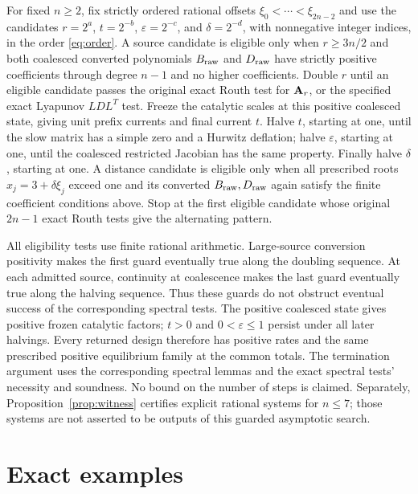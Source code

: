 \begin{remark}\label{rem:design}
For fixed \(n\ge2\), fix strictly ordered rational offsets
\(\xi_0<\cdots<\xi_{2n-2}\) and use the candidates
\(r=2^a\), \(t=2^{-b}\), \(\varepsilon=2^{-c}\), and
\(\delta=2^{-d}\), with nonnegative integer indices, in the order
\eqref{eq:order}. A source candidate is eligible only when
\(r\ge3n/2\) and both coalesced converted polynomials \(B_{\mathrm{raw}}\)
and \(D_{\mathrm{raw}}\) have strictly positive coefficients through degree
\(n-1\) and no higher coefficients. Double \(r\) until an eligible
candidate passes the original exact Routh test for \(\mathbf A_r\), or the
specified exact Lyapunov \(LDL^T\) test. Freeze the catalytic scales at
this positive coalesced state, giving unit prefix currents and final
current \(t\). Halve \(t\), starting at one, until the slow matrix has
a simple zero and a Hurwitz deflation; halve \(\varepsilon\), starting
at one, until the coalesced restricted Jacobian has the same property.
Finally halve \(\delta\), starting at one. A distance candidate is
eligible only when all prescribed roots \(x_j=3+\delta\xi_j\) exceed one
and its converted \(B_{\mathrm{raw}},D_{\mathrm{raw}}\) again satisfy the finite
coefficient conditions above. Stop at the first eligible candidate
whose original \(2n-1\) exact Routh tests give the alternating pattern.

All eligibility tests use finite rational arithmetic. Large-source
conversion positivity makes the first guard eventually true along the
doubling sequence. At each admitted source, continuity at coalescence
makes the last guard eventually true along the halving sequence. Thus
these guards do not obstruct eventual success of the corresponding
spectral tests. The positive coalesced state gives positive frozen
catalytic factors; \(t>0\) and \(0<\varepsilon\le1\) persist under all
later halvings. Every returned design therefore has positive rates and
the same prescribed positive equilibrium family at the common totals.
The termination argument uses the corresponding spectral lemmas and
the exact spectral tests' necessity and soundness. No bound on the
number of steps is claimed. Separately, Proposition~\ref{prop:witness}
certifies explicit rational systems for \(n\le7\); those systems are not
asserted to be outputs of this guarded asymptotic search.
\end{remark}

\section{Exact examples}\label{sec:examples}

